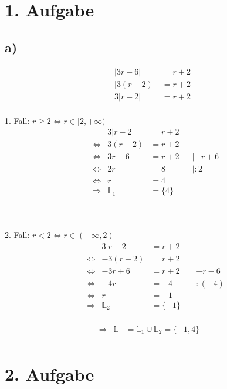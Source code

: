 \documentclass[]{article}
\newcommand{\eq}{\Leftrightarrow}
\newcommand{\rarr}{\Rightarrow}
\begin{document}
\section*{1. Aufgabe}
\subsection*{a)}
	\begin{align*}
		&& |3r-6| &= r+2&&\\
		&& |3(r-2)| &= r+2&&\\
		&& 3|r-2| &= r+2&&\\
	\end{align*}
	\begin{center}\begin{minipage}{0.45\textwidth}
		1. Fall: $r \ge 2 \eq r \in [2,+\infty)$
		\begin{align*}
			&& 3|r-2| &= r+2 &&\\
			&\eq& 3(r-2) &= r+2 &&\\
			&\eq& 3r-6 &= r+2 &&|-r+6\\
			&\eq& 2r &= 8 &&|:2\\
			&\eq& r &= 4 &&\\
			&\rarr& \mathbb{L}_1 &= \{4\} &&\\
		\end{align*}
	\end{minipage} ~\vline~ \begin{minipage}{0.45\textwidth}
		2. Fall: $r < 2 \eq r \in (-\infty,2)$
		\begin{align*}
			&& 3|r-2| &= r+2 &&\\
			&\eq& -3(r-2) &= r+2 &&\\
			&\eq& -3r+6 &= r+2 &&|-r-6\\
			&\eq& -4r &= -4 &&|:(-4)\\
			&\eq& r &= -1 &&\\
			&\rarr& \mathbb{L}_2 &= \{-1\} &&\\
		\end{align*}
	\end{minipage}\end{center}
	\begin{align*}
		&\rarr& \mathbb{L} &= \mathbb{L}_1 \cup \mathbb{L}_2 = \{-1,4\} &&\\
	\end{align*}

\section*{2. Aufgabe}
\end{document}
